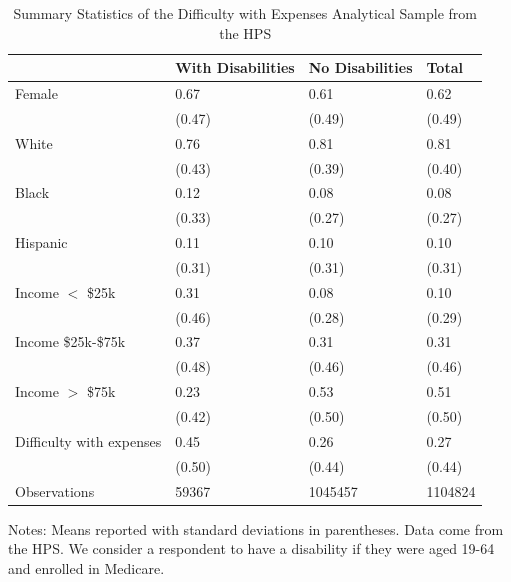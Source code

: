\documentclass[12pt]{article}
\begin{document}
\begin{table}[!ht]
    \centering
    \caption{Summary Statistics of the Difficulty with Expenses Analytical Sample from the HPS}
    \begin{tabular}{llll}
    \hline \hline
        ~ & With Disabilities & No Disabilities & Total \\ \hline
        Female & 0.67  & 0.61  & 0.62  \\ 
        ~ & (0.47) & (0.49) & (0.49) \\ 
        White & 0.76  & 0.81  & 0.81  \\ 
        ~ & (0.43) & (0.39) & (0.40) \\ 
        Black & 0.12  & 0.08  & 0.08  \\ 
        ~ & (0.33) & (0.27) & (0.27) \\ 
        Hispanic & 0.11  & 0.10  & 0.10  \\ 
        ~ & (0.31) & (0.31) & (0.31) \\ 
        Income $<$ \$25k & 0.31  & 0.08  & 0.10  \\ 
        ~ & (0.46) & (0.28) & (0.29) \\ 
        Income \$25k-\$75k & 0.37  & 0.31  & 0.31  \\ 
        ~ & (0.48) & (0.46) & (0.46) \\ 
        Income $>$ \$75k & 0.23  & 0.53  & 0.51  \\ 
        ~ & (0.42) & (0.50) & (0.50) \\ 
        Difficulty with expenses & 0.45  & 0.26  & 0.27  \\ 
        ~ & (0.50) & (0.44) & (0.44) \\ 
        Observations & 59367 & 1045457 & 1104824 \\ 
        \hline \hline
    \end{tabular}
    \label{hps_diff_expns_sample}
    \medskip 
\begin{minipage}{0.8\textwidth} 
{\footnotesize Notes: Means reported with standard deviations in parentheses. Data come from the HPS. We consider a respondent to have a disability if they were aged 19-64 and enrolled in Medicare. \par}
\end{minipage}
\end{table}
\end{document}
